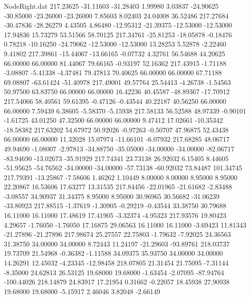 \begin{filecontents}{NodeRight.dat}
 217.23625  -31.11603  -31.28403     1.99980    3.03837  -24.90625  -30.85000  -23.26000  -23.26000    7.85603    8.02403   24.04008   36.52486
 217.27684  -30.47836  -28.26279     4.43505    4.86480  -12.95312  -21.39375  -12.53000  -12.53000   17.94836   15.73279   53.51566   58.70125
 217.34761  -25.81253  -18.05878    -0.18476    0.78218  -10.16250  -24.79062  -12.53000  -12.53000   13.28253    5.52878   -2.22460    9.41802
 217.39861  -15.44067  -13.66165    -0.07732    4.32761   56.54688   44.20625   66.00000   66.00000   81.44067   79.66165   -0.93197   52.16362
 217.43915   -1.71188   -3.08807    -5.41338   -4.37481   79.47813   70.40625   66.00000   66.00000   67.71188   69.08807  -63.61424  -51.40978
 217.49001   49.57764   25.54413    -4.26738   -1.54563   50.97500   63.83750   66.00000   66.00000   16.42236   40.45587  -48.89367  -17.70912
 217.54066   58.40561   59.61395    -0.47126   -0.43544   40.22187   40.56250   66.00000   66.00000    7.59439    6.38605   -5.58370   -5.15938
 217.58133   56.52588   48.97339    -0.90101   -1.61725   43.01250   47.32500   66.00000   66.00000    9.47412   17.02661  -10.35342  -18.58382
 217.63202   54.67972   50.92026    -0.97263   -0.50707   47.96875   52.43438   66.00000   66.00000   11.32028   15.07974  -11.66101   -6.07932
 217.68285   48.06717   49.94690    -1.08007   -2.97813  -34.88750  -35.05000  -34.00000  -34.00000  -82.06717  -83.94690  -13.02673  -35.91929
 217.74341   23.73138   26.92032     6.15405    8.44605  -51.95625  -54.76562  -34.00000  -34.00000  -57.73138  -60.92032   73.84487  101.34745
 217.79391  -13.25867   -7.58606     1.46262    1.10449    8.00000    8.00000    8.95000    8.95000   22.20867   16.53606   17.63277   13.31535
 217.84456  -22.01965  -21.61682    -2.83488   -3.08557   34.90937   31.34375    8.95000    8.95000   30.96965   30.56682  -31.06239  -33.80923
 217.88515   -1.37619   -1.30905    -0.29219   -0.43544   33.38750   30.79688   16.11000   16.11000   17.48619   17.41905   -3.32374   -4.95323
 217.93576   19.80423    4.29657    -1.76050   -1.76050   17.16875   29.06563   16.11000   16.11000   -3.69423   11.81343  -21.27896  -21.27896
 217.98674   25.27557   22.75803    -1.79632   -7.92025   24.36563   31.38750   34.00000   34.00000    8.72443   11.24197  -21.29603  -93.89761
 218.03737   19.73709   21.54968    -0.36382   -1.11588   34.09375   35.93750   34.00000   34.00000   14.26291   12.45032   -4.23345  -12.98458
 218.07805   21.31454   21.75095    -7.31144   -8.35000   24.62813   26.53125   19.68000   19.68000   -1.63454   -2.07095  -87.94764 -100.44026
 218.14879   24.83917   17.21954     0.31662   -0.22057   18.45938   27.90938   19.68000   19.68000   -5.15917    2.46046    3.82048   -2.66149

\end{filecontents}
